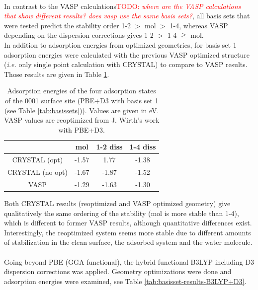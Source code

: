 \documentclass[11pt,DIV=13,BCOR=5mm,a4paper,headinclude]{scrbook}
\newcommand\todo[1]{\textcolor{red}{TODO: \textit{{#1}}}}
\begin{document}
\\
In contrast to the VASP calculations\todo{where are the VASP calculations that show different results? does vasp use the same basis sets?}, all basis sets that were tested predict the stability order 1-2 $>$ mol $>$ 1-4, whereas VASP depending on the dispersion corrections gives 1-2 $>$ 1-4 $\geqq$ mol.
\\
In addition to adsorption energies from optimized geometries, for basis set 1 adsorption energies were calculated with the previous VASP optimized structure (\textit{i.e.} only single point calculation with CRYSTAL) to compare to VASP results.
Those results are given in Table \ref{tab:pbe-vasp-geom}.
\begin{table}[!h]
  \centering
   \caption{Adsorption energies of the four adsorption states of the 0001 surface site (PBE+D3 with basis set 1 (see Table \ref{tab:basissets})).
Values are given in eV.
VASP values are reoptimized from J. Wirth's work with PBE+D3.}
  \begin{tabular}{cccc}%
  \toprule
   &mol & 1-2 diss & 1-4 diss\\\midrule %
CRYSTAL (opt) & -1.57 & 1.77 &-1.38 \\%
   CRYSTAL (no opt)&-1.67 &-1.87 &-1.52\\%
  VASP &-1.29 &-1.63 &-1.30 \\%
  \bottomrule
  \end{tabular}
  \label{tab:pbe-vasp-geom}
\end{table}
Both CRYSTAL results (reoptimized and VASP optimized geometry) give qualitatively the same ordering of the stability (mol is more stable than 1-4), which is different to former VASP results, although quantitative differences exist.
Interestingly, the reoptimized system seems more stable due to different amounts of stabilization in the clean surface, the adsorbed system and the water molecule.
\\\\
Going beyond PBE (GGA functional), the hybrid functional B3LYP including D3 dispersion corrections was applied.
Geometry optimizations were done and adsorption energies were examined, see Table \ref{tab:basisset-results-B3LYP+D3}.
\end{document}
